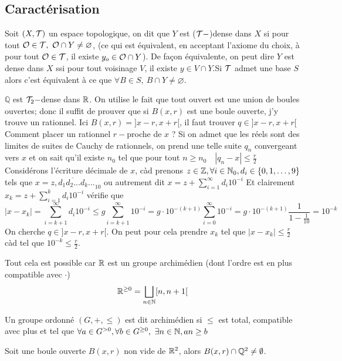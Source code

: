 \subsection{Caractérisation}
Soit $(X,\mathcal{T})$ un espace topologique, on dit que $Y$ est ($\mathcal{T}-$)dense dans $X$ si pour tout $\ouvert\in \topologie,\ \ouvert\cap Y\neq \varnothing$,  (ce qui est équivalent, en acceptant l'axiome du choix, à  pour tout $\mathcal{O}\in\mathcal{T}$, il existe $y_o\in \mathcal{O}\cap Y$). De façon équivalente, on peut dire $Y$ est dense dans $X$ ssi pour tout voisinage $V$, il existe $y\in V\cap Y$.Si $\mathcal{T}$ admet une base $S$ alors c'est équivalent à ce que $\forall B\in S,\ B\cap Y\ne\varnothing$. 
\begin{exemple}
    $\mathbb{Q}$ est $\mathcal{T}_2-$dense dans $\mathbb{R}$. On utilise le fait que tout ouvert est une union de boules ouvertes; donc  il suffit de prouver que si
    $B(x,r)$ est une boule ouverte, j'y trouve un rationnel. Ici $B(x,r)=]x-r,x+r[$, il faut trouver $q\in ]x-r,x+r[$ Comment placer un rationnel $r-$proche de $x$ ? Si on admet que les réels sont des limites de suites de Cauchy de rationnels, on prend une telle suite $q_n$ convergeant vers $x$ et on sait qu'il existe $n_0$ tel que pour tout $n\geq n_0\quad |q_n-x|\leq \frac{r}{2}$
   Considérons l'écriture décimale de $x$, càd prenons $z\in\mathbb{Z},\forall i\in\mathbb{N}_0, d_i\in\{0,1,\ldots,9\}$ tels que $x=\overline{ z,d_1d_2...d_k...}_{10}$ ou autrement dit $x=z+\sum_{i=1}^\infty d_i10^{-i}$
    Et clairement $x_k=z+\sum_{i=1}^kd_i10^{-i}$ vérifie que 
    \[
    |x-x_k|=\sum_{i=k+1}^\infty d_i10^{-i}\leq g\sum_{i=k+1}^\infty10^{-i}=g\cdot10^{-(k+1)}\sum_{i=0}^\infty10^{-i}=g\cdot10^{-(k+1)}\frac{1}{1-\frac{1}{10}}=10^{-k}
    \]
    On cherche $q\in ]x-r,x+r[$. On peut pour cela prendre $x_k$ tel que $|x-x_k|\leq \frac{r}{2}$ càd tel que $10^{-k}\leq \frac{r}{2}$.
\end{exemple}
\begin{remarque}
    Tout cela est possible car $\mathbb{R}$ est un groupe archimédien (dont l'ordre est en plus compatible avec $\cdot$)
    \[
    \mathbb{R}^{\geq0}=\bigsqcup_{n\in \mathbb{N}}[n,n+1[
    \]
\end{remarque}
\begin{definition}
    Un groupe ordonné $(G,+,\leq)$ est dit archimédien si $\leq$ est total, compatible avec plus et tel que $\forall a\in G^{>0},\forall b\in G^{\geq 0},\ \exists n\in\N, an\geq b$
\end{definition}


\begin{proposition}
        Soit une boule ouverte $B(x,r)$ non vide de $\mathbb{R}^2$, alors $B(x,r)\cap \mathbb{Q}^2\neq \emptyset$. 
\end{proposition}

